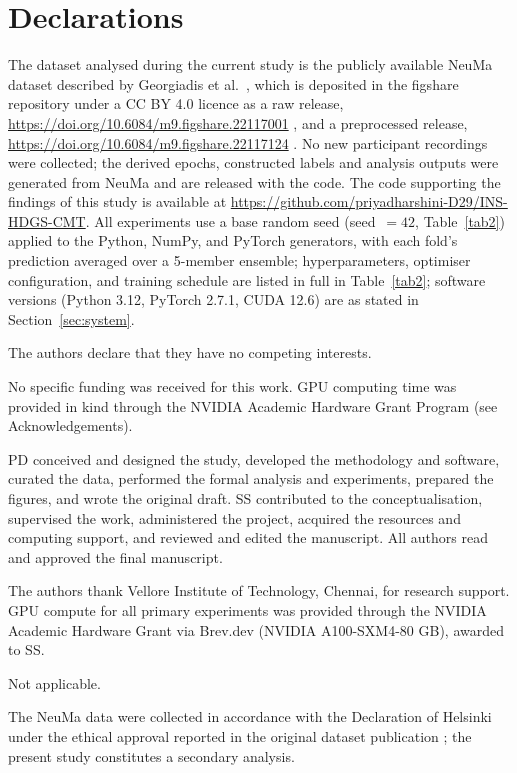 \documentclass[pdflatex,sn-basic,Numbered,twocolumn,iicol]{sn-jnl}
\theoremstyle{thmstyleone}%
\theoremstyle{thmstyletwo}%
\theoremstyle{thmstylethree}%
\begin{document}
\section*{Declarations}

The dataset analysed during the current study is the publicly available NeuMa dataset described by Georgiadis et al.\ \cite{ref35}, which is deposited in the figshare repository under a CC BY 4.0 licence as a raw release, \url{https://doi.org/10.6084/m9.figshare.22117001} \cite{ref59}, and a preprocessed release, \url{https://doi.org/10.6084/m9.figshare.22117124} \cite{ref60}. No new participant recordings were collected; the derived epochs, constructed labels and analysis outputs were generated from NeuMa and are released with the code. The code supporting the findings of this study is available at \url{https://github.com/priyadharshini-D29/INS-HDGS-CMT}. All experiments use a base random seed (seed~$=42$, Table~\ref{tab2}) applied to the Python, NumPy, and PyTorch generators, with each fold's prediction averaged over a 5-member ensemble; hyperparameters, optimiser configuration, and training schedule are listed in full in Table~\ref{tab2}; software versions (Python 3.12, PyTorch 2.7.1, CUDA 12.6) are as stated in Section~\ref{sec:system}.

The authors declare that they have no competing interests.

No specific funding was received for this work. GPU computing time was provided in kind through the NVIDIA Academic Hardware Grant Program (see Acknowledgements).

PD conceived and designed the study, developed the methodology and software, curated the data, performed the formal analysis and experiments, prepared the figures, and wrote the original draft. SS contributed to the conceptualisation, supervised the work, administered the project, acquired the resources and computing support, and reviewed and edited the manuscript. All authors read and approved the final manuscript.

The authors thank Vellore Institute of Technology, Chennai, for research support. GPU compute for all primary experiments was provided through the NVIDIA Academic Hardware Grant via Brev.dev (NVIDIA A100-SXM4-80 GB), awarded to SS.

Not applicable.

The NeuMa data were collected in accordance with the Declaration of Helsinki under the ethical approval reported in the original dataset publication \cite{ref35}; the present study constitutes a secondary analysis.
\end{document}
